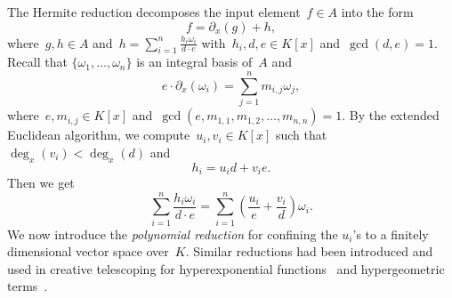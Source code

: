 \documentclass{sig-alternate}
\begin{document}
The Hermite reduction decomposes the input element~$f\in A$ into the form
\[f = \partial_x(g) + h,\]
where~$g, h\in A$ and~$h = \sum_{i=1}^n \frac{h_i \omega_i}{d\cdot e}$ with~$h_i, d, e\in K[x]$ and~$\gcd(d, e)=1$.
Recall that $\{\omega_1, \ldots, \omega_n\}$ is an integral basis of~$A$ and
\[e \cdot  \partial_x(\omega_i) = \sum_{j=1}^n m_{i, j}\omega_j,\]
where~$e, m_{i, j}\in K[x]$ and~$\gcd(e, m_{1, 1}, m_{1, 2}, \ldots, m_{n, n})=1$.
By the extended Euclidean algorithm, we compute~$u_i, v_i\in K[x]$ such that
$\deg_x(v_i) < \deg_x(d)$ and
\[h_i = u_i d + v_i e.\]
Then we get
\[ \sum_{i=1}^n \frac{h_i\omega_i}{d \cdot e} =  \sum_{i=1}^n \left(\frac{u_i}{e} + \frac{v_i}{d}\right)\omega_i.\]
We now introduce the \emph{polynomial reduction} for confining the $u_i$'s to a finitely
dimensional vector space over~$K$. Similar reductions had been introduced and used in creative telescoping
for hyperexponential functions~\cite{bostan13a} and hypergeometric terms~\cite{chen15a}.
\end{document}
